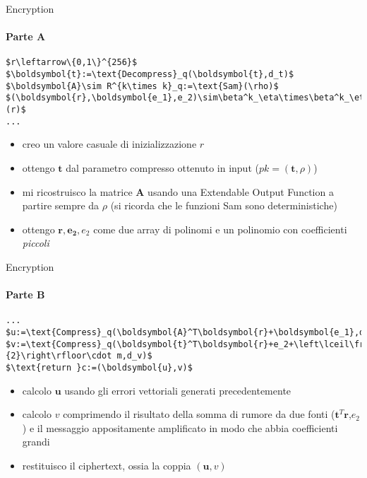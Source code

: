 \begin{frame}[fragile]{Encryption}
    \framesubtitle{Parte A}
    \begin{minipage}{0.45\linewidth}
        \begin{lstlisting}[title=Kyber.CPA.Enc(pk\,m):,mathescape=true]
$r\leftarrow\{0,1\}^{256}$
$\boldsymbol{t}:=\text{Decompress}_q(\boldsymbol{t},d_t)$
$\boldsymbol{A}\sim R^{k\times k}_q:=\text{Sam}(\rho)$
$(\boldsymbol{r},\boldsymbol{e_1},e_2)\sim\beta^k_\eta\times\beta^k_\eta\times\beta_\eta:=\text{Sam}(r)$
...
        \end{lstlisting}
    \end{minipage}\hfill
    \begin{minipage}{0.5\linewidth}
        \begin{itemize}%
            \item creo un valore casuale di inizializzazione $r$
            \item ottengo $\boldsymbol{t}$ dal parametro compresso ottenuto in input ($pk=(\boldsymbol{t},\rho)$)
            \item mi ricostruisco la matrice $\boldsymbol{A}$ usando una Extendable Output Function a partire sempre da $\rho$ (si ricorda che le funzioni Sam sono deterministiche)
            \item ottengo $\boldsymbol{r},\boldsymbol{e_2},e_2$ come due array di polinomi e un polinomio con coefficienti \textit{piccoli}

        \end{itemize}
    \end{minipage}
\end{frame}

\begin{frame}[fragile]{Encryption}
    \framesubtitle{Parte B}
    \begin{minipage}{0.45\linewidth}
        \begin{lstlisting}[title=Kyber.CPA.Enc(pk\,m):,mathescape=true,firstnumber=4]
...
$u:=\text{Compress}_q(\boldsymbol{A}^T\boldsymbol{r}+\boldsymbol{e_1},d_u)$
$v:=\text{Compress}_q(\boldsymbol{t}^T\boldsymbol{r}+e_2+\left\lceil\frac{q}{2}\right\rfloor\cdot m,d_v)$
$\text{return }c:=(\boldsymbol{u},v)$
        \end{lstlisting}
    \end{minipage}\hfill
    \begin{minipage}{0.5\linewidth}
        \begin{itemize}%
            \item calcolo $\boldsymbol{u}$ usando gli errori vettoriali generati precedentemente
            \item calcolo $v$ comprimendo il risultato della somma di rumore da due fonti ($\boldsymbol{t}^T\boldsymbol{r}$,$e_2$) e il messaggio appositamente amplificato in modo che abbia coefficienti grandi
            \item restituisco il ciphertext, ossia la coppia $(\boldsymbol{u},v)$
        \end{itemize}
    \end{minipage}
\end{frame}

